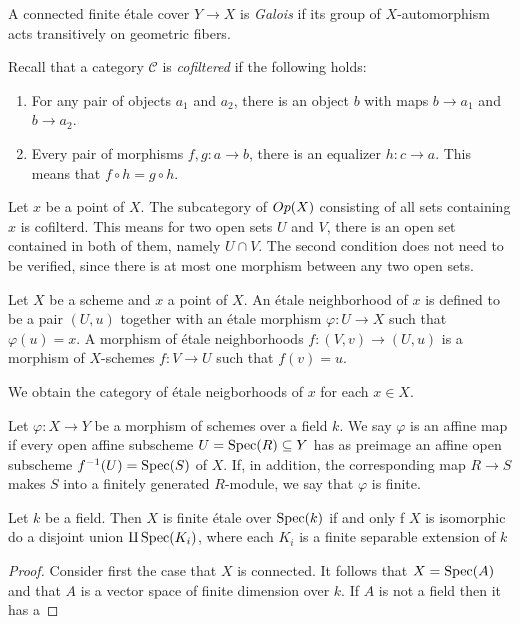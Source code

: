 \begin{definition}
  A connected finite \'etale cover $Y \to X$ is \textit{Galois} if its group of $X$-automorphism acts transitively on geometric fibers.
\end{definition}


\begin{remark}
  Recall that a category $\mathcal{C}$ is \textit{cofiltered} if the following holds:
  \begin{enumerate}
    \item For any pair of objects $a_1$ and $a_2$, there is an object $b$ with maps $b \to a_1$ and $b \to a_2$.
    \item Every pair of morphisms $f,g: a \to b$, there is an equalizer $h: c \to a$. This means that $f \circ h = g \circ h$.
  \end{enumerate} 
  Let $x$ be a point of $X$. The subcategory of $Op(X)$ consisting of all sets containing $x$ is cofilterd. This means for two open sets $U$ and $V$, there is an open set contained in both of them, namely $U \cap V$. The second condition does not need to be verified, since there is at most one morphism between any two open sets.
\end{remark}

\begin{definition}
  Let $X$ be a scheme and $x$ a point of $X$. An \'etale neighborhood of $x$ is defined to be a pair $(U, u)$ together with an \'etale morphism $\varphi: U \to X$ such that $\varphi(u) = x$. A morphism of \'etale neighborhoods $f: (V,v) \to (U,u)$ is a morphism of $X$-schemes $f: V \to U$ such that $f(v) = u$.
\end{definition}
We obtain the category of \'etale neigborhoods of $x$ for each $x \in X$.

\begin{definition}
  Let $\varphi: X \to Y$ be a morphism of schemes over a field $k$. We say $\varphi$ is an affine map if every open affine subscheme $U = \operatorname{Spec}(R) \subseteq Y$ has as preimage an affine open subscheme $f^{-1}(U) = \operatorname{Spec}(S)$ of $X$. If, in addition, the corresponding map $R \to S$ makes $S$ into a finitely generated $R$-module, we say that $\varphi$ is finite.
\end{definition}

\begin{proposition}
Let $k$ be a field. Then $X$ is finite \'etale over $\operatorname{Spec}(k)$ if and only f $X$ is isomorphic do a disjoint union $\amalg \operatorname{Spec}(K_i)$, where each $K_i$ is a finite separable extension of $k$
\end{proposition}
\begin{proof}
  Consider first the case that $X$ is connected. It follows that $X = \operatorname{Spec}(A)$ and that $A$ is a vector space of finite dimension over $k$. If $A$ is not a field then it has a
\end{proof}


